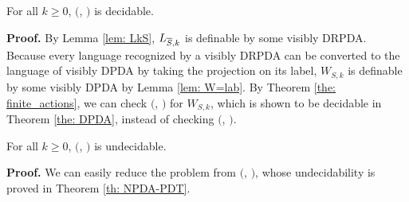 \begin{theorem}
For all $k\geq 0$, \Real $($\DRPDAv, \RPDTk$)$ is decidable.
\end{theorem}
{\bf Proof.}\quad
By Lemma \ref{lem: LkS}, $L_{{\overline{S}},k}$ is definable by some visibly DRPDA.
Because every language recognized by a visibly DRPDA can be converted to
the language of visibly DPDA by taking the projection on its label,
$W_{S,k}$ is definable by some visibly DPDA by Lemma \ref{lem: W=lab}.
By Theorem \ref{the: finite_actions}, we can check \Real $($\DPDA, \PDT$)$ for $W_{S,k}$, which is shown to be decidable in Theorem \ref{the: DPDA}, instead of checking \Real $($\DRPDAv, \RPDTk$)$.

\begin{theorem}
For all $k\geq 0$, \Real $($\NRPDA, \RPDTk$)$ is undecidable.
\end{theorem}
{\bf Proof.}\quad
We can easily reduce the problem from \Real $($\NPDA, \PDT$)$,
whose undecidability is proved in Theorem \ref{th: NPDA-PDT}.


